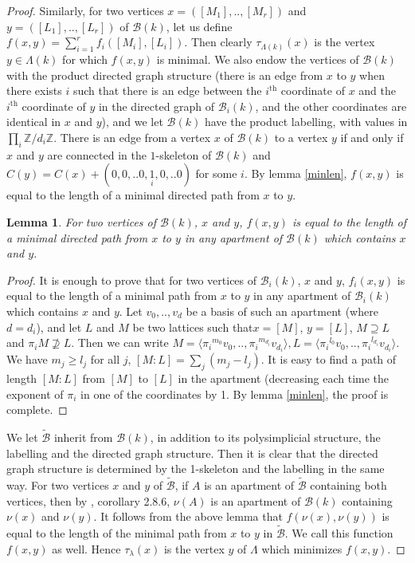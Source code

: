 \documentclass{amsart}
\theoremstyle{theorem}
\theoremstyle{lemma}
\newtheorem{lemma}{Lemma}[section]
\theoremstyle{prop}
\theoremstyle{definition}
\theoremstyle{corollary}
\theoremstyle{remark}
\newcommand{\Z}{\mathbb{Z}}
\newcommand{\B}{\mathcal{B}}
\begin{document}
\begin{proof}
Similarly, for two vertices $x=([M_1],..,[M_r])$ and $y=([L_1],..,[L_r])$ of $\B(k)$, let us define $f(x,y) = \sum_{i=1}^r{f_i([M_i],[L_i])}$. Then clearly $\tau_{\Lambda(k)}(x)$ is the vertex $y\in \Lambda(k)$ for which $f(x,y)$ is minimal. We  also endow the vertices of $\B(k)$ with the product directed graph structure (there is an edge from $x$ to $y$ when there exists $i$ such that there is an edge between the $i^\text{th}$ coordinate of $x$ and the $i^\text{th}$ coordinate of $y$ in the directed graph of $\B_i(k)$, and the other coordinates are identical in $x$ and $y$), and we let $\B(k)$ have the product labelling, with values in $\prod_i \Z / d_i \Z$. 
There is an edge from a vertex $x$ of $\B(k)$ to a vertex $y$ if and only if $x$ and $y$ are connected in the $1$-skeleton of $\B(k)$ and $C(y)=C(x)+(0,0,..0,\underset{i}{1},0,..0)$ for some $i$. By lemma \ref{minlen}, $f(x,y)$ is equal to the length of a minimal directed path from $x$ to $y$. 
\begin{lemma}
For two vertices of $\B(k)$, $x$ and $y$, $f(x,y)$ is equal to the length of a minimal directed path from $x$ to $y$ in any apartment of $\B(k)$ which contains $x$ and $y$.
\end{lemma}\begin{proof}
It is enough to prove that for two vertices of $\B_i(k)$, $x$ and $y$, $f_i(x,y)$ is equal to the length of a minimal path from $x$ to $y$ in any apartment of $\B_i(k)$ which contains $x$ and $y$.
Let $v_0,..,v_{d}$ be a basis of such an apartment (where $d=d_i$), and let $L$ and $M$ be two lattices such that$x=[M]$, $y=[L]$, $M \supseteq L$ and $\pi_i M \nsupseteq L$. Then we can write $M=\langle{\pi_i}^{m_0}v_0,..,{\pi_i}^{m_{d_i}}v_{d_i}\rangle, L=\langle{\pi_i}^{l_0}v_0,..,{\pi_i}^{l_{d_i}}v_{d_i}\rangle$. We have $m_j \geq l_j$ for all $j$, $[M:L]=\sum_j (m_j-l_j)$. It is easy to find a path of length $[M:L]$ from $[M]$ to $[L]$ in the apartment (decreasing each time the exponent of $\pi_i$ in one of the coordinates by 1. By lemma \ref{minlen}, the proof is complete.
\end{proof}

We let $\tilde{\B}$ inherit from $\B(k)$, in addition to its polysimplicial structure, the labelling and the directed graph structure. Then it is clear that the directed graph structure is determined by the 1-skeleton and the labelling in the same way. For two vertices $x$ and $y$ of $\tilde{\B}$, if $A$ is an apartment of $\tilde{\B}$ containing both vertices, then by \cite{brt}, corollary 2.8.6, $\nu(A)$ is an apartment of $\B(k)$ containing $\nu(x)$ and $\nu(y)$. It follows from the above lemma that $f(\nu(x), \nu(y))$ is equal to the length of the minimal path from $x$ to $y$ in $\tilde{\B}$. We call this function $f(x,y)$ as well. Hence $\tau_\lambda(x)$ is the vertex $y$ of $\Lambda$ which minimizes $f(x,y)$.


\end{proof}
\end{document}
